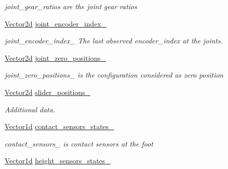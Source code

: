 \begin{DoxyCompactItemize}
\begin{DoxyCompactList}\small\item\em joint\+\_\+gear\+\_\+ratios are the joint gear ratios \end{DoxyCompactList}\item 
\hyperlink{common__header_8hpp_acb6916bc8c9fe9d98c484fd4cc201447}{Vector2d} \hyperlink{classblmc__robots_1_1Teststand_a2a0b967c36ea63a8bb564bdeebcc0846}{joint\+\_\+encoder\+\_\+index\+\_\+}\hypertarget{classblmc__robots_1_1Teststand_a2a0b967c36ea63a8bb564bdeebcc0846}{}\label{classblmc__robots_1_1Teststand_a2a0b967c36ea63a8bb564bdeebcc0846}

\begin{DoxyCompactList}\small\item\em joint\+\_\+encoder\+\_\+index\+\_\+ The last observed encoder\+\_\+index at the joints. \end{DoxyCompactList}\item 
\hyperlink{common__header_8hpp_acb6916bc8c9fe9d98c484fd4cc201447}{Vector2d} \hyperlink{classblmc__robots_1_1Teststand_a5923674652df619a0692333fb27b8369}{joint\+\_\+zero\+\_\+positions\+\_\+}\hypertarget{classblmc__robots_1_1Teststand_a5923674652df619a0692333fb27b8369}{}\label{classblmc__robots_1_1Teststand_a5923674652df619a0692333fb27b8369}

\begin{DoxyCompactList}\small\item\em joint\+\_\+zero\+\_\+positions\+\_\+ is the configuration considered as zero position \end{DoxyCompactList}\item 
\hyperlink{common__header_8hpp_acb6916bc8c9fe9d98c484fd4cc201447}{Vector2d} \hyperlink{classblmc__robots_1_1Teststand_ad0ce099eef5b57553d36927e3f7f1203}{slider\+\_\+positions\+\_\+}
\begin{DoxyCompactList}\small\item\em Additional data. \end{DoxyCompactList}\item 
\hyperlink{common__header_8hpp_a932c1319d78144ebcaa8938ae070b784}{Vector1d} \hyperlink{classblmc__robots_1_1Teststand_a49bb3cd738af64ef41a9a3d12dde9ac2}{contact\+\_\+sensors\+\_\+states\+\_\+}\hypertarget{classblmc__robots_1_1Teststand_a49bb3cd738af64ef41a9a3d12dde9ac2}{}\label{classblmc__robots_1_1Teststand_a49bb3cd738af64ef41a9a3d12dde9ac2}

\begin{DoxyCompactList}\small\item\em contact\+\_\+sensors\+\_\+ is contact sensors at the foot \end{DoxyCompactList}\item 
\hyperlink{common__header_8hpp_a932c1319d78144ebcaa8938ae070b784}{Vector1d} \hyperlink{classblmc__robots_1_1Teststand_af9c7f9537b7123dae498d08d5c80fe07}{height\+\_\+sensors\+\_\+states\+\_\+}\hypertarget{classblmc__robots_1_1Teststand_af9c7f9537b7123dae498d08d5c80fe07}{}\label{classblmc__robots_1_1Teststand_af9c7f9537b7123dae498d08d5c80fe07}


\end{DoxyCompactItemize}

